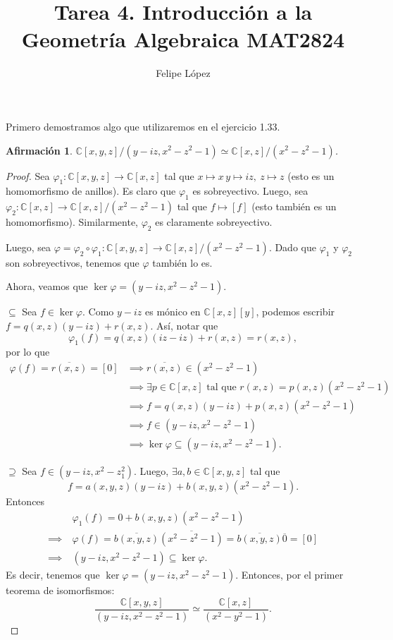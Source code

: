\documentclass{amsart}
\title{Tarea 4. Introducción a la Geometría Algebraica MAT2824}
\author{Felipe López}
\theoremstyle{plain}
\newtheorem*{af}{Afirmación}
\newcommand{\C}{\mathbb{C}}
\begin{document}
	\maketitle

	Primero demostramos algo que utilizaremos en el ejercicio 1.33.
	\begin{af}
		$\C[x,y,z] \slash (y - iz, x^{2} - z^{2} - 1) \simeq \C[x,z] \slash (x^{2} - z^{2} - 1)$.
	\end{af}
	\begin{proof}
		Sea $\varphi_{1} \colon \C[x,y,z] \to \C[x,z]$ tal que $x \mapsto x\, y \mapsto iz,\ z \mapsto z$ (esto es un homomorfismo de anillos). Es claro que $\varphi_{1}$ es sobreyectivo. Luego, sea $\varphi_{2} \colon \C[x,z] \to \C[x,z] \slash (x^{2} - z^{2} - 1)$ tal que $f \mapsto [f]$ (esto también es un homomorfismo). Similarmente, $\varphi_{2}$ es claramente sobreyectivo. \par
		Luego, sea $\varphi = \varphi_{2} \circ \varphi_{1} \colon \C[x,y,z] \to \C[x,z] \slash (x^{2} - z^{2} - 1)$. Dado que $\varphi_{1}$ y $\varphi_{2}$ son sobreyectivos, tenemos que $\varphi$ también lo es. \par
		Ahora, veamos que $\ker \varphi = (y - iz, x^{2} - z^{2} - 1)$. \par
		$\boxed{\subseteq}$ Sea $f \in \ker \varphi$. Como $y - iz$ es mónico en $\C[x,z][y]$, podemos escribir $f = q(x,z)(y - iz) + r(x,z)$. Así, notar que
		\[ \varphi_{1}(f) = q(x,z)(iz - iz) + r(x,z) = r(x,z), \]
		por lo que
		\begin{align*}
			\varphi(f) = \overline{r(x,z)} = [0] &\implies \overline{r(x,z)} \in (x^{2} - z^{2} - 1) \\
			&\implies \exists p \in \C[x,z] \text{ tal que } r(x,z) = p(x,z)(x^{2} - z^{2} - 1) \\
			&\implies f = q(x,z)(y - iz) + p(x,z)(x^{2} - z^{2} - 1) \\
			&\implies f \in (y - iz, x^{2} - z^{2} - 1) \\
			&\implies \ker \varphi \subseteq (y - iz, x^{2} - z^{2} - 1)
		.\end{align*}
		\par $\boxed{\supseteq}$ Sea $f \in (y - iz, x^{2} - z^{2} _ 1)$. Luego, $\exists a,b \in \C[x,y,z]$ tal que
		\[ f = a(x,y,z)(y - iz) + b(x,y,z)(x^{2} - z^{2} - 1). \]
		Entonces
		\begin{align*}
			&\varphi_{1}(f) = 0 + b(x,y,z)(x^{2} - z^{2} - 1) \\
			\implies \ & \varphi(f) = \overline{b(x,y,z)} \overline{(x^{2} - z^{2} - 1)} = \overline{b(x,y,z)} \overline{0} = [0] \\
			\implies \ & (y - iz, x^{2} - z^{2} - 1) \subseteq \ker \varphi
		.\end{align*}
		Es decir, tenemos que $\ker \varphi = (y - iz, x^{2} - z^{2} - 1)$. Entonces, por el primer teorema de isomorfismos:
		\[ \frac{\C[x,y,z]}{(y - iz, x^{2} - z^{2} - 1)} \simeq \frac{\C[x,z]}{(x^{2} - y^{2} - 1)}. \]
	\end{proof}
\end{document}
